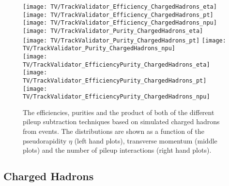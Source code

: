 

\clearpage{}

\begin{figure}[Ht]
    \centering
    \texttt{[image: TV/TrackValidator\_Efficiency\_ChargedHadrons\_eta]}
    \texttt{[image: TV/TrackValidator\_Efficiency\_ChargedHadrons\_pt]}
    \texttt{[image: TV/TrackValidator\_Efficiency\_ChargedHadrons\_npu]}
    \\
    \texttt{[image: TV/TrackValidator\_Purity\_ChargedHadrons\_eta]}
    \texttt{[image: TV/TrackValidator\_Purity\_ChargedHadrons\_pt]}
    \texttt{[image: TV/TrackValidator\_Purity\_ChargedHadrons\_npu]}
    \\
    \texttt{[image: TV/TrackValidator\_EfficiencyPurity\_ChargedHadrons\_eta]}
    \texttt{[image: TV/TrackValidator\_EfficiencyPurity\_ChargedHadrons\_pt]}
    \texttt{[image: TV/TrackValidator\_EfficiencyPurity\_ChargedHadrons\_npu]}
    \caption[Efficiencies, purities and their product of the different pileup subtraction techniques based on simulated charged hadrons from \ttbar events]{The efficiencies, purities and the product of both of the different pileup subtraction techniques based on simulated charged hadrons from \ttbar events. The distributions are shown as a function of the pseudorapidity $\eta$ (left hand plots), transverse momentum (middle plots) and the number of pileup interactions (right hand plots). \label{plot:TACOACHSignal}}
\end{figure}

\subsection{Charged Hadrons \label{sec:TASEFRDACH}}


